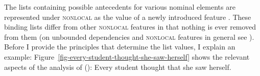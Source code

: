 \documentclass[output=paper
 	        ,biblatex
                ,babelshorthands
                ,newtxmath
                ,draftmode
                ,colorlinks, citecolor=brown
]{langscibook}
\begin{document}
\noindent
The lists containing possible antecedents for various nominal elements are represented under
\textsc{nonlocal} as the value of a newly introduced feature . These binding lists differ from
other \textsc{nonlocal} features in that nothing is ever removed from them (on unbounded dependencies
and \textsc{nonlocal} features in general see ). Before I provide the principles that
determine the list values, I explain an example:
Figure~\ref{fig-every-student-thought-she-saw-herself} shows the relevant aspects of the analysis of ():
\ea
Every student thought that she saw herself.
\z
\begin{sidewaysfigure}
\centering
\resizebox{.8\textwidth}{!}{%
\begin{forest}
[\avm{
   [ list-a  & < > \\
     list-z  & < > \\
     list-u  & < \1, \2, \3, \4, \5 >\\
     list-lu & < \1, \2, \3, \4, \5 > ] }
   [\avm{
     [ \ldots cont|conds & < \ldots, [ arg-r & \1 ], \ldots > \\
       \ldots |binding   & [ list-a  & < > \\
                             list-z  & < > \\
                             list-u  & < \1, \2, \3, \4, \5 >\\
                             list-lu & < \1 > ] ]}
     [ctx]]
   [\avm{
     [ list-a  & < \2, \3 > \\
       list-z  & < \2, \3 > \\
       list-u  & < \1, \2, \3, \4, \5 >\\
       list-lu & < \2, \3, \4, \5 > ]} 
     [\avm{
       [ \ldots anaphora & [ r-mark & \3 \\
                             var    & \2 \\ ]\\
         \ldots |binding   & [ list-a  & < \2, \3 > \\
                               list-z  & < \2, \3 > \\
                               list-u  & < \1, \2, \3, \4, \5 >\\
                               list-lu & < \2, \3 > ] ]} 
       [every student, roof]]
      [\avm{
          [ list-a  & < \2, \3 > \\
            list-z  & < \2, \3 > \\
            list-u  & < \1, \2, \3, \4, \5 >\\
}
\end{forest}}
\end{sidewaysfigure}
\end{document}
